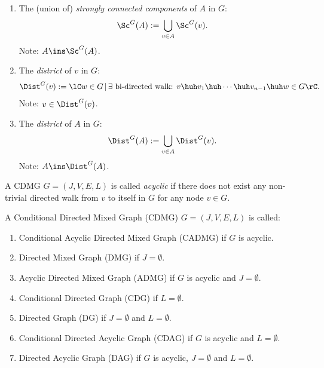 \begin{Def}
\begin{enumerate}
             Note: $v \in \Sc^G(v)$.
         \item[] The (union of) \emph{strongly connected components} of $A$ in $G$:
             \[ \Sc^G(A) := \bigcup_{v \in A} \Sc^G(v).\]
             Note: $A \ins \Sc^G(A)$.
         \item The \emph{district} of $v$ in $G$:
             \[\Dist^G(v) := \lC w \in G\,|\, \exists \text{ bi-directed walk: } 
             v \huh v_1 \huh \cdots \huh v_{n-1} \huh w \in G \rC.\]
             Note: $v\in \Dist^G(v)$.
         \item[] The \emph{district} of $A$ in $G$:
             \[\Dist^G(A) := \bigcup_{v \in A} \Dist^G(v).\]
             Note: $A \ins \Dist^G(A)$.
     \end{enumerate}
\end{Def}


\begin{Def}[Acyclicity]
    \label{def-acylic}
    A  CDMG  $G=(J,V,E,L)$  is called \emph{acyclic} if there does not exist 
    any non-trivial directed walk from $v$ to itself in $G$ for any node $v \in G$.
\end{Def}

\begin{Def}
    A  Conditional Directed Mixed Graph (CDMG)  $G=(J,V,E,L)$  is called:
   \begin{enumerate}
       \item Conditional Acyclic Directed Mixed Graph (CADMG) if $G$ is acyclic.
       \item Directed Mixed Graph (DMG) if $J = \emptyset$.
       \item Acyclic Directed Mixed Graph (ADMG) if $G$ is acyclic and $J = \emptyset$.
       \item Conditional Directed Graph (CDG) if $L = \emptyset$.
       \item Directed Graph (DG) if $J = \emptyset$ and $L = \emptyset$.
       \item Conditional Directed Acyclic Graph (CDAG) if $G$ is acyclic and $L = \emptyset$.
       \item Directed Acyclic Graph (DAG) if $G$ is acyclic, $J=\emptyset$ and $L = \emptyset$.
   \end{enumerate}
\end{Def}

